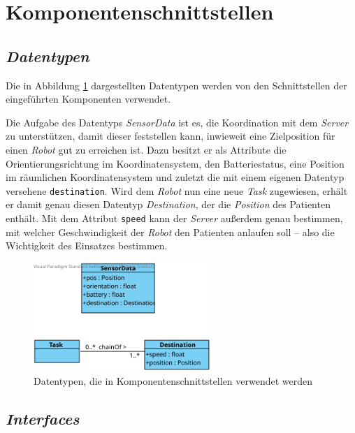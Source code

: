 \section{Komponentenschnittstellen}

\subsection{\textit{Datentypen}}
Die in Abbildung \ref{KomponentenschnittstellenDiagramm} dargestellten Datentypen werden von den Schnittstellen der eingeführten Komponenten verwendet.

Die Aufgabe des Datentyps \emph{SensorData} ist es, die Koordination mit dem \emph{Server} zu unterstützen, damit dieser feststellen kann, inwieweit eine Zielposition für einen \emph{Robot} gut zu erreichen ist. 
Dazu besitzt er als Attribute die Orientierungsrichtung im Koordinatensystem, den Batteriestatus, eine Position im räumlichen Koordinatensystem und zuletzt die mit einem eigenen Datentyp versehene \texttt{destination}. 
Wird dem \emph{Robot} nun eine neue \emph{Task} zugewiesen, erhält er damit genau diesen Datentyp \emph{Destination}, der die \emph{Position} des Patienten enthält. 
Mit dem Attribut \texttt{speed} kann der \emph{Server} außerdem genau bestimmen, mit welcher Geschwindigkeit der \emph{Robot} den Patienten anlaufen soll – also die Wichtigkeit des Einsatzes bestimmen.
\vspace{1cm}

	\begin{figure}[H]
		\centering
		\includegraphics[width=0.6\textwidth]{img/0-Entwurf-3}
		\caption{Datentypen, die in Komponentenschnittstellen verwendet werden}
		\label{KomponentenschnittstellenDiagramm}
	\end{figure}
	\pagebreak

\subsection{\textit{Interfaces}}
